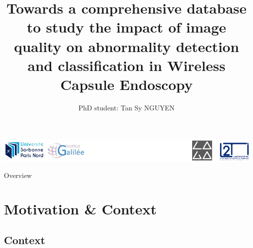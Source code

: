 \documentclass{libs/ufc_format}
\title[Universit\'e Sorbonne Paris Nord]{\textbf{Towards a comprehensive database to study the impact of image quality on abnormality detection and classification in Wireless Capsule Endoscopy}}
\author{PhD student: Tan Sy NGUYEN }
\institute[]{
    \normalsize Thesis director: Prof. Hatem Zaag (LAGA) \\ Thesis supervisors: Assoc. Prof. John Chaussard (LAGA),\\ \hspace{2.1cm}Assoc. Prof. Marie Luong (L2TI)\\Tutor : Prof. Azeddine Beghdadi (L2TI)
    \newline
    \uspn
}
\begin{document}


\begin{frame}{}
    \centering
    \includegraphics[scale=0.4]{libs/back.png}
    \maketitle
\end{frame}

\begin{frame}{Overview}
    \tableofcontents
\end{frame}

\section{Motivation \& Context}
\subsection{Context}
\end{document}
